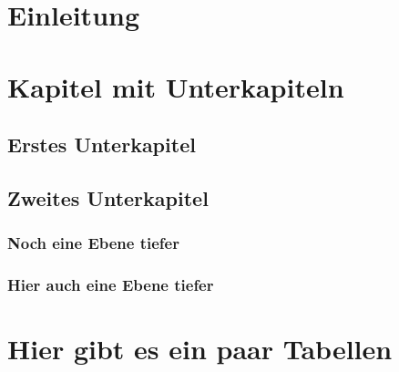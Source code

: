 \documentclass[12pt, oneside]{article}
\begin{document}

\newpage
{}
\setcounter{page}{1}



\section{Einleitung} \label{einleitung}



\newpage  

\section{Kapitel mit Unterkapiteln} \label{Kapitel mit Unterkapiteln}

    \subsection{Erstes Unterkapitel}\label{Erstes Unterkapitel}
    
    \subsection{Zweites Unterkapitel}\label{Zweites Unterkapitel}
    
        \subsubsection{Noch eine Ebene tiefer} \label{Noch eine Ebene tiefer}
        
        \subsubsection{Hier auch eine Ebene tiefer}\label{Hier auch eine Ebene tiefer}
        
 

\newpage

\section{Hier gibt es ein paar Tabellen} \label{Hier gibt es ein paar Tabellen}


\end{document}
